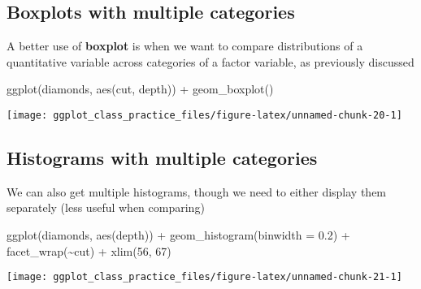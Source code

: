 \documentclass[
]{article}
\newenvironment{Shaded}{\begin{snugshade}}{\end{snugshade}}
\newcommand{\AttributeTok}[1]{\textcolor[rgb]{0.77,0.63,0.00}{#1}}
\newcommand{\DecValTok}[1]{\textcolor[rgb]{0.00,0.00,0.81}{#1}}
\newcommand{\FloatTok}[1]{\textcolor[rgb]{0.00,0.00,0.81}{#1}}
\newcommand{\FunctionTok}[1]{\textcolor[rgb]{0.00,0.00,0.00}{#1}}
\newcommand{\NormalTok}[1]{#1}
\newcommand{\SpecialCharTok}[1]{\textcolor[rgb]{0.00,0.00,0.00}{#1}}
\begin{document}
\hypertarget{boxplots-with-multiple-categories}{%
\subsection{Boxplots with multiple
categories}\label{boxplots-with-multiple-categories}}

A better use of \textbf{boxplot} is when we want to compare
distributions of a quantitative variable across categories of a factor
variable, as previously discussed

\begin{Shaded}
\begin{Highlighting}[]
\FunctionTok{ggplot}\NormalTok{(diamonds, }\FunctionTok{aes}\NormalTok{(cut, depth)) }\SpecialCharTok{+} \FunctionTok{geom\_boxplot}\NormalTok{()}
\end{Highlighting}
\end{Shaded}

\begin{center}\texttt{[image: ggplot\_class\_practice\_files/figure-latex/unnamed-chunk-20-1]} \end{center}

\hypertarget{histograms-with-multiple-categories}{%
\subsection{Histograms with multiple
categories}\label{histograms-with-multiple-categories}}

We can also get multiple histograms, though we need to either display
them separately (less useful when comparing)

\begin{Shaded}
\begin{Highlighting}[]
\FunctionTok{ggplot}\NormalTok{(diamonds, }\FunctionTok{aes}\NormalTok{(depth)) }\SpecialCharTok{+} \FunctionTok{geom\_histogram}\NormalTok{(}\AttributeTok{binwidth =} \FloatTok{0.2}\NormalTok{) }\SpecialCharTok{+} 
    \FunctionTok{facet\_wrap}\NormalTok{(}\SpecialCharTok{\textasciitilde{}}\NormalTok{cut) }\SpecialCharTok{+} \FunctionTok{xlim}\NormalTok{(}\DecValTok{56}\NormalTok{, }\DecValTok{67}\NormalTok{)}
\end{Highlighting}
\end{Shaded}

\begin{center}\texttt{[image: ggplot\_class\_practice\_files/figure-latex/unnamed-chunk-21-1]} \end{center}
\end{document}
